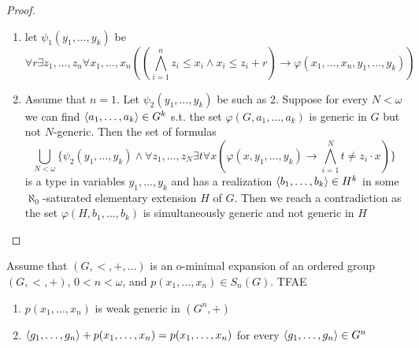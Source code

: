 \documentclass[11pt]{article}
\begin{document}
\begin{proof}
\begin{enumerate}
\item let \(\psi_1(y_1,\dots,y_k)\) be
\begin{equation*}
\forall r\exists z_1,\dots,z_n\forall x_1,\dots,x_n((\bigwedge_{i=1}^nz_i\le x_i\wedge x_i\le z_i+r)\to\varphi(x_1,\dots,x_n,y_1,\dots,y_k))
\end{equation*}
\setcounter{enumi}{2}
\item Assume that \(n=1\). Let \(\psi_2(y_1,\dots,y_k)\) be such as 2. Suppose for every \(N<\omega\) we can
find \(\langle a_1,\dots,a_k\rangle\in G^k\) s.t. the set \(\varphi(G,a_1,\dots,a_k)\) is generic in \(G\) but
not \(N\)-generic. Then the set of formulas
\begin{equation*}
\bigcup_{N<\omega}\{\psi_2(y_1,\dots,y_k)\wedge\forall z_1,\dots,z_N\exists t\forall x(\varphi(x,y_1,\dots,y_k)\to\bigwedge_{i=1}^Nt\neq z_i\cdot x)\}
\end{equation*}
is a type in variables \(y_1,\dots,y_k\) and has a realization \(\langle b_1,\dots,b_k\rangle\in H^k\) in
some \(\aleph_0\)-saturated elementary extension \(H\) of \(G\). Then we reach a contradiction as
the set \(\varphi(H,b_1,\dots,b_k)\) is simultaneously generic and not generic in \(H\)
\end{enumerate}
\end{proof}

\begin{corollary}[]
Assume that \((G,<,+,\dots)\) is an o-minimal expansion of an ordered group \((G,<,+)\), \(0<n<\omega\),
and \(p(x_1,\dots,x_n)\in S_n(G)\). TFAE
\begin{enumerate}
\item \(p(x_1,\dots,x_n)\) is weak generic in \((G^n,+)\)
\item \(\langle g_1,\dots,g_n\rangle+p(x_1,\dots,x_n)=p(x_1,\dots,x_n)\) for every \(\langle g_1,\dots,g_n\rangle\in  G^n\)
\end{enumerate}
\end{corollary}
\end{document}
